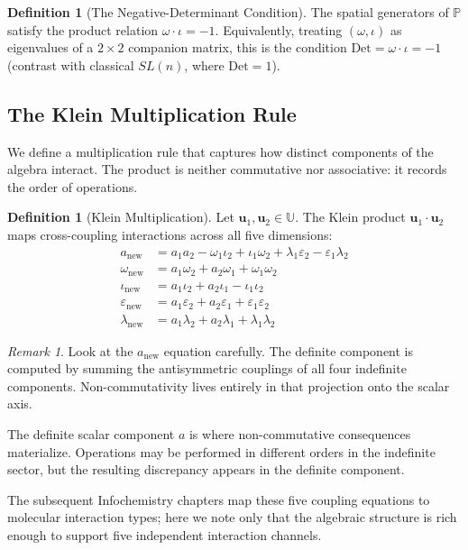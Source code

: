 \documentclass[12pt,oneside]{article}
\theoremstyle{principia}
\theoremstyle{definition}
\newtheorem{definition}[theorem]{Definition}
\theoremstyle{remark}
\newtheorem{remark}[theorem]{Remark}
\providecommand{\UU}{\mathbb{U}}
\providecommand{\PP}{\mathbb{P}}
\providecommand{\eps}{\varepsilon}
\providecommand{\lam}{\lambda}
\begin{document}
\begin{definition}[The Negative-Determinant Condition]\label{def:sl-1}\label{thm:bridge}
The spatial generators of $\PP$ satisfy the product relation $\omega \cdot \iota = -1$. Equivalently, treating $(\omega, \iota)$ as eigenvalues of a $2 \times 2$ companion matrix, this is the condition $\mathrm{Det} = \omega \cdot \iota = -1$ (contrast with classical $SL(n)$, where $\mathrm{Det} = 1$).
\end{definition}

\subsection{The Klein Multiplication Rule}\label{sec:klein}

We define a multiplication rule that captures how distinct components of the algebra interact. The product is neither commutative nor associative: it records the order of operations.

\begin{definition}[Klein Multiplication]\label{def:klein}
Let $\mathbf{u}_1, \mathbf{u}_2 \in \UU$. The Klein product $\mathbf{u}_1 \cdot \mathbf{u}_2$ maps cross-coupling interactions across all five dimensions:
\begin{align}
a_{\mathrm{new}} &= a_1 a_2 - \omega_1 \iota_2 + \iota_1 \omega_2 + \lam_1 \eps_2 - \eps_1 \lam_2 \\
\omega_{\mathrm{new}} &= a_1 \omega_2 + a_2 \omega_1 + \omega_1 \omega_2 \\
\iota_{\mathrm{new}} &= a_1 \iota_2 + a_2 \iota_1 - \iota_1 \iota_2 \\
\eps_{\mathrm{new}} &= a_1 \eps_2 + a_2 \eps_1 + \eps_1 \eps_2 \\
\lam_{\mathrm{new}} &= a_1 \lam_2 + a_2 \lam_1 + \lam_1 \lam_2
\end{align}
\end{definition}

\begin{remark}
Look at the $a_{\mathrm{new}}$ equation carefully. The definite component is computed by summing the antisymmetric couplings of all four indefinite components. Non-commutativity lives entirely in that projection onto the scalar axis.

The definite scalar component $a$ is where non-commutative consequences materialize. Operations may be performed in different orders in the indefinite sector, but the resulting discrepancy appears in the definite component.

The subsequent Infochemistry chapters map these five coupling equations to molecular interaction types; here we note only that the algebraic structure is rich enough to support five independent interaction channels.
\end{remark}
\end{document}

